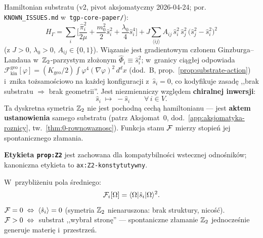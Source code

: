 \begin{axiom}%
\label{ax:Z2-konstytutywny}\label{prop:Z2}
Hamiltonian substratu (v2, pivot aksjomatyczny 2026-04-24; por.
\texttt{KNOWN\_ISSUES.md} w~\texttt{tgp-core-paper/}):
\begin{equation}\label{eq:H-Gamma}
    H_\Gamma = \sum_i \biggl[
      \frac{\hat{\pi}_i^2}{2\mu}
    + \frac{m_0^2}{2}\hat{s}_i^2
    + \frac{\lambda_0}{4}\hat{s}_i^4
    \biggr]
    + J\!\sum_{\langle ij\rangle} A_{ij}\,
      \hat{s}_i^2\,\hat{s}_j^2\,
      \bigl(\hat{s}_j^2 - \hat{s}_i^2\bigr)^2
\end{equation}
(z $J>0$, $\lambda_0>0$, $A_{ij}\in\{0,1\}$). Wi\k{a}zanie jest gradientowym
cz\l{}onem Ginzburga--Landaua w~$\mathbb{Z}_2$-parzystym z\l{}o\.zonym
$\hat{\Phi}_i \equiv \hat{s}_i^2$; w~granicy ci\k{a}g\l{}ej odpowiada
$\mathcal{F}^{\mathrm{geo}}_{\mathrm{kin}}[\varphi] = (K_{\mathrm{geo}}/2)
\int \varphi^4 (\nabla\varphi)^2\,d^dx$ (dod.~B,
prop.~\ref{prop:substrate-action}) i~znika to\.zsamo\'sciowo na ka\.zdej
konfiguracji z~$\hat{s}_i = 0$, co kodyfikuje zasad\k{e}
,,brak substratu $\Rightarrow$ brak geometrii''. Jest niezmienniczy
wzgl\k{e}dem \textbf{chiralnej inwersji}:
\begin{equation}\label{eq:Z2-chiral}
    \hat{s}_i \;\mapsto\; -\hat{s}_i
    \qquad \forall\, i \in V.
\end{equation}
Ta dyskretna symetria $\mathbb{Z}_2$ nie jest pochodn\k{a} cech\k{a}
hamiltonianu --- jest \textbf{aktem ustanowienia} samego substratu
(patrz Aksjomat~0, dod.~\ref{app:aksjomatyka-roznicy},
tw.~\ref{thm:0-rownowaznosc}). Funkcja stanu $\mathcal{F}$ mierzy
stopie\'n jej spontanicznego z\l{}amania.

\medskip
\noindent\textbf{Etykieta \texttt{prop:Z2}} jest zachowana dla
kompatybilno\'sci wstecznej odno\'snik\'ow; kanoniczna etykieta to
\texttt{ax:Z2-konstytutywny}.
\end{axiom}

\begin{corollary}\label{cor:F-s}
W~przybli\.zeniu pola \'sredniego:
\begin{equation}\label{eq:F-s-relation}
    \mathcal{F}_i[\Omega]
    = \langle\Omega|\hat{s}_i|\Omega\rangle^2.
\end{equation}
$\mathcal{F} = 0 \;\Leftrightarrow\;
\langle\hat{s}_i\rangle = 0$
(symetria $\mathbb{Z}_2$ nienaruszona: brak struktury,
nico\'s\'c). $\mathcal{F} > 0 \;\Leftrightarrow\;$
substrat ,,wybra\l{} stron\k{e}'' --- spontaniczne
z\l{}amanie $\mathbb{Z}_2$ jednocze\'snie generuje materi\k{e}
i~przestrze\'n.
\end{corollary}

